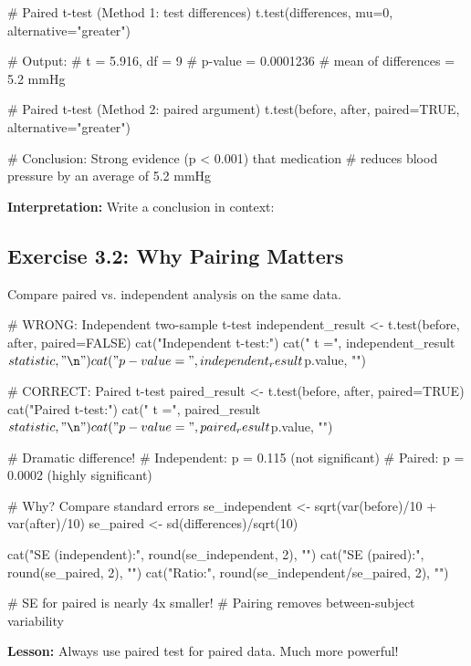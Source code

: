 \documentclass[11pt]{article}
\begin{document}
\newpage

\begin{rcode}
# Paired t-test (Method 1: test differences)
t.test(differences, mu=0, alternative="greater")

# Output:
# t = 5.916, df = 9
# p-value = 0.0001236
# mean of differences = 5.2 mmHg

# Paired t-test (Method 2: paired argument)
t.test(before, after, paired=TRUE, alternative="greater")

# Conclusion: Strong evidence (p < 0.001) that medication
# reduces blood pressure by an average of 5.2 mmHg
\end{rcode}

\textbf{Interpretation:} Write a conclusion in context:

\vspace{2cm}

\subsection{Exercise 3.2: Why Pairing Matters}

Compare paired vs. independent analysis on the same data.

\begin{rcode}
# WRONG: Independent two-sample t-test
independent_result <- t.test(before, after, paired=FALSE)
cat("Independent t-test:\n")
cat("  t =", independent_result$statistic, "\n")
cat("  p-value =", independent_result$p.value, "\n\n")

# CORRECT: Paired t-test
paired_result <- t.test(before, after, paired=TRUE)
cat("Paired t-test:\n")
cat("  t =", paired_result$statistic, "\n")
cat("  p-value =", paired_result$p.value, "\n\n")

# Dramatic difference!
# Independent: p = 0.115 (not significant)
# Paired: p = 0.0002 (highly significant)

# Why? Compare standard errors
se_independent <- sqrt(var(before)/10 + var(after)/10)
se_paired <- sd(differences)/sqrt(10)

cat("SE (independent):", round(se_independent, 2), "\n")
cat("SE (paired):", round(se_paired, 2), "\n")
cat("Ratio:", round(se_independent/se_paired, 2), "\n")

# SE for paired is nearly 4x smaller!
# Pairing removes between-subject variability
\end{rcode}

\textbf{Lesson:} Always use paired test for paired data. Much more powerful!
\end{document}
